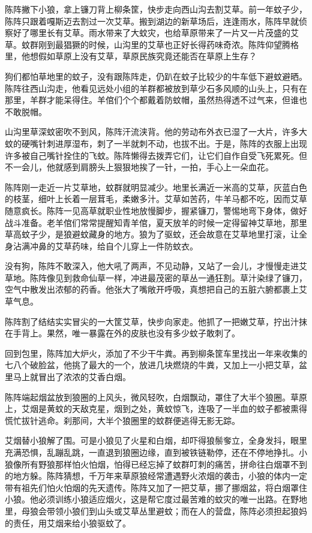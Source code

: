 \par 
\par 陈阵撇下小狼，拿上镰刀背上柳条筐，快步走向西山沟去割艾草。前一年蚊子少，陈阵只跟着嘎斯迈去割过一次艾草。搬到湖边的新草场后，连逢雨水，陈阵早就侦察好了哪里长有艾草。雨水带来了大蚊灾，也给草原带来了一片又一片茂盛的艾草。蚊群刚到最猖獗的时候，山沟里的艾草也正好长得药味奇浓。陈阵仰望腾格里，他想假如草原上没有艾草，草原民族究竟还能否在草原上生存？
\par 狗们都怕草地里的蚊子，没有跟陈阵走，仍趴在蚊子比较少的牛车低下避蚊避晒。陈阵往西山沟走，他看见远处小组的羊群都被放到草少石多风顺的山头上，只有在那里，羊群才能呆得住。羊倌们个个都戴着防蚊帽，虽然热得透不过气来，但谁也不敢脱帽。
\par 山沟里草深蚊密吹不到风，陈阵汗流浃背。他的劳动布外衣已湿了一大片，许多大蚊的硬嘴针刺进厚湿布，刺了一半就刺不动，也拔不出。于是，陈阵的衣服上出现许多被自己嘴针拴住的飞蚊。陈阵懒得去拨弄它们，让它们自作自受飞死累死。但不一会儿，他就感到肩膀头上狠狠地挨了一针，一拍，手心上一朵血花。
\par 陈阵刚一走近一片艾草地，蚊群就明显减少。地里长满近一米高的艾草，灰蓝白色的枝茎，细叶上长着一层茸毛，柔嫩多汁。艾草如苦药，牛羊马都不吃，因而艾草随意疯长。陈阵一见高草就职业性地放慢脚步，握紧镰刀，警惕地弯下身体，做好战斗准备。老羊倌们常常提醒知青羊倌，夏天放羊的时候一定得留神艾草地，那里草高蚊子少，是狼避蚊藏身的地方。狼为了驱蚊，还会故意在艾草地里打滚，让全身沾满冲鼻的艾草药味，给自个儿穿上一件防蚊衣。
\par 没有狗，陈阵不敢深入，他大吼了两声，不见动静，又站了一会儿，才慢慢走进艾草地。陈阵像见到救命仙草一样，冲进最茂密的草丛一通狂割。草汁染绿了镰刀，空气中散发出浓郁的药香。他张大了嘴敞开呼吸，真想把自己的五脏六腑都裹上艾草气息。
\par 陈阵割了结结实实冒尖的一大筐艾草，快步向家走。他抓了一把嫩艾草，拧出汁抹在手背上。果然，唯一暴露在外的皮肤也没有多少蚊子敢刺了。
\par 回到包里，陈阵加大炉火，添加了不少干牛粪。再到柳条筐车里找出一年来收集的七八个破脸盆，他挑了最大的一个，放进几块燃烧的牛粪，又加上一小把艾草，盆里马上就冒出了浓浓的艾香白烟。
\par 陈阵端起烟盆放到狼圈的上风头，微风轻吹，白烟飘动，罩住了大半个狼圈。草原上，艾烟是黄蚊的天敌克星，烟到之处，黄蚊惊飞，连吸了一半血的蚊子都被熏得慌忙拔针逃命。刹那间，大半个狼圈里的蚊群便逃得无影无踪。
\par 艾烟替小狼解了围。可是小狼见了火星和白烟，却吓得狼鬃奓立，全身发抖，眼里充满恐惧，乱蹦乱跳，一直退到狼圈边缘，直到被铁链勒停，还在不停地挣扎。小狼像所有野狼那样怕火怕烟，怕得已经忘掉了蚊群叮刺的痛苦，拼命往白烟罩不到的地方躲。陈阵猜想，千万年来草原狼经常遭遇野火浓烟的袭击，小狼的体内一定带有祖先们怕火怕烟的先天遗传。陈阵又加了一把艾草，挪了挪烟盆，将白烟罩住小狼。他必须训练小狼适应烟火，这是帮它度过最苦难的蚊灾的唯一出路。在野地里，母狼会带领小狼们到山头或艾草丛里避蚊；而在人的营盘，陈阵必须担起狼妈的责任，用艾烟来给小狼驱蚊了。
